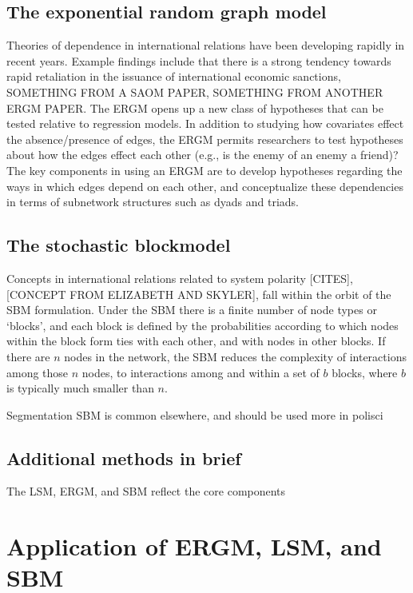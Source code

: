 \documentclass[fleqn,12pt]{wlscirep}
\begin{document}
\subsection{The exponential random graph model}

Theories of dependence in international relations have been developing rapidly in recent years. Example findings include that there is a strong tendency towards rapid retaliation in the issuance of international economic sanctions, SOMETHING FROM A SAOM PAPER, SOMETHING FROM ANOTHER ERGM PAPER.  The ERGM opens up a new class of hypotheses that can be tested relative to regression models. In addition to studying how covariates effect the absence/presence of edges, the ERGM permits researchers to test hypotheses about how the edges effect each other (e.g., is the enemy of an enemy a friend)? The key components in using an ERGM are to develop hypotheses regarding the ways in which edges depend on each other, and conceptualize these dependencies in terms of subnetwork structures such as dyads and triads.

\subsection{The stochastic blockmodel}

Concepts in international relations related to system polarity [CITES], [CONCEPT FROM ELIZABETH AND SKYLER], fall within the orbit of the SBM formulation. Under the SBM there is a finite number of node types or `blocks', and each block is defined by the probabilities according to which nodes within the block form ties with each other, and with nodes in other blocks. If there are $n$ nodes in the network, the SBM reduces the complexity of interactions among those $n$  nodes, to interactions among and within a set of $b$ blocks, where $b$ is typically much smaller than $n$. 


Segmentation SBM is common elsewhere, and should be used more in polisci

\subsection{Additional methods in brief}

The LSM, ERGM, and SBM reflect the core components



\section{Application of ERGM, LSM, and SBM}
\end{document}
